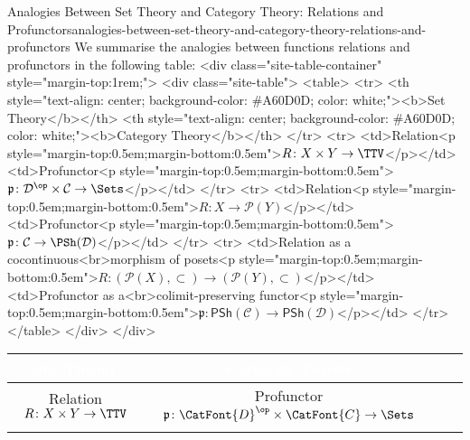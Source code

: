 \begin{remark}{Analogies Between Set Theory and Category Theory: Relations and Profunctors}{analogies-between-set-theory-and-category-theory-relations-and-profunctors}%
    We summarise the analogies between functions relations and profunctors in the following table:
    <div class="site-table-container" style="margin-top:1rem;">
      <div class="site-table">
        <table>
          <tr>
            <th style="text-align: center; background-color: #A60D0D; color: white;"><b>Set Theory</b></th>
            <th style="text-align: center; background-color: #A60D0D; color: white;"><b>Category Theory</b></th>
          </tr>
          <tr>
            <td>Relation<p style="margin-top:0.5em;margin-bottom:0.5em">$R\colon X\times Y\to\TTV$</p></td>
            <td>Profunctor<p style="margin-top:0.5em;margin-bottom:0.5em">$\mathfrak{p}\colon\mathcal{D}^{\op}\times\mathcal{C}\to\Sets$</p></td>
          </tr>
          <tr>
            <td>Relation<p style="margin-top:0.5em;margin-bottom:0.5em">$R\colon X\to\mathcal{P}(Y)$</p></td>
            <td>Profunctor<p style="margin-top:0.5em;margin-bottom:0.5em">$\mathfrak{p}\colon\mathcal{C}\to\PSh(\mathcal{D})$</p></td>
          </tr>
          <tr>
            <td>Relation as a cocontinuous<br>morphism of posets<p style="margin-top:0.5em;margin-bottom:0.5em">$R\colon(\mathcal{P}(X),\subset)\to(\mathcal{P}(Y),\subset)$</p></td>
            <td>Profunctor as a<br>colimit-preserving functor<p style="margin-top:0.5em;margin-bottom:0.5em">$\mathfrak{p}\colon\mathsf{PSh}(\mathcal{C})\to\mathsf{PSh}(\mathcal{D})$</p></td>
          </tr>
        </table>
      </div>
    </div>
    \begingroup%
    \setlength\cellspacetoplimit{3pt}
    \setlength\cellspacebottomlimit{3pt}
    \renewcommand{\arraystretch}{1.2}
    \begin{center}
        \begin{tabular}{|Sc|Sc|}\hline{}
            \textcolor{white}{\textbf{\textsc{Set Theory}}}                                                                                                                                       & \textcolor{white}{\textbf{\textsc{Category Theory}}}                                                                                                               \\\hline{}
            Relation $R\colon X\times Y\to\TTV$                                                                                                                                                   & Profunctor $\mathfrak{p}\colon\CatFont{D}^{\op}\times\CatFont{C}\to\Sets$                                                                                 \\

\end{tabular}
\end{center}
\end{remark}
